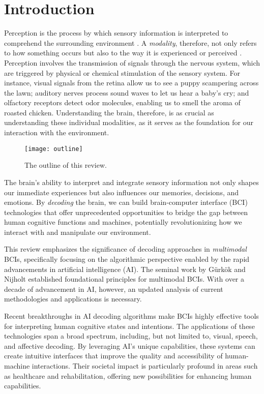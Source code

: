 \documentclass[journal]{IEEEtran}
\begin{document}
\section{Introduction}

Perception is the process by which sensory information is interpreted to comprehend the surrounding environment \cite{Schacter2009}. A \textit{modality}, therefore, not only refers to how something occurs but also to the way it is experienced or perceived \cite{Baltrusaitis2019}. Perception involves the transmission of signals through the nervous system, which are triggered by physical or chemical stimulation of the sensory system. For instance, visual signals from the retina allow us to see a puppy scampering across the lawn; auditory nerves process sound waves to let us hear a baby's cry; and olfactory receptors detect odor molecules, enabling us to smell the aroma of roasted chicken. Understanding the brain, therefore, is as crucial as understanding these individual modalities, as it serves as the foundation for our interaction with the environment.

\begin{figure*}[htpb] \centering
\texttt{[image: outline]}
\caption{The outline of this review.} \label{fig:outline}
\end{figure*}

The brain's ability to interpret and integrate sensory information not only shapes our immediate experiences but also influences our memories, decisions, and emotions. By \textit{decoding} the brain, we can build brain-computer interface (BCI) technologies that offer unprecedented opportunities to bridge the gap between human cognitive functions and machines, potentially revolutionizing how we interact with and manipulate our environment.

This review emphasizes the significance of decoding approaches in \textit{multimodal} BCIs, specifically focusing on the algorithmic perspective enabled by the rapid advancements in artificial intelligence (AI). The seminal work by Gürkök and Nijholt \cite{Guerkoek2012} established foundational principles for multimodal BCIs. With over a decade of advancement in AI, however, an updated analysis of current methodologies and applications is necessary.

Recent breakthroughs in AI decoding algorithms make BCIs highly effective tools for interpreting human cognitive states and intentions. The applications of these technologies span a broad spectrum, including, but not limited to, visual, speech, and affective decoding. By leveraging AI's unique capabilities, these systems can create intuitive interfaces that improve the quality and accessibility of human-machine interactions. Their societal impact is particularly profound in areas such as healthcare and rehabilitation, offering new possibilities for enhancing human capabilities.
\end{document}
